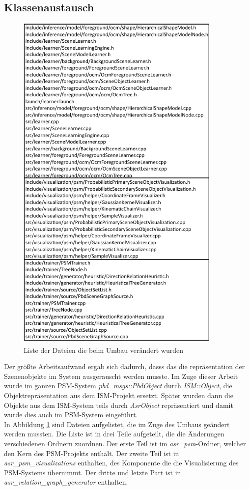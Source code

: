 \subsection{Klassenaustausch}
\begin{figure}
	\centering
	\includegraphics[width=10cm]{bilder/filelist.pdf}
	\caption{Liste der Dateien die beim Umbau verändert wurden}
	\label{img:filelist}
\end{figure}
Der größte Arbeitsaufwand ergab sich dadurch, dasss das die repräsentation der Szenenobjekte im System ausgerauscht werden musste. Im Zuge dieser Arbeit wurde im ganzen PSM-System \textit{pbd\_msgs::PbdObject} durch \textit{ISM::Object}, die Objektrepräsentation aus dem ISM-Projekt ersetzt. Später wurden dann die Objekte aus dem ISM-System teils durch \textit{AsrObject} repräsentiert und damit wurde dies auch im PSM-System eingeführt.\smallskip\\
In Abbildung \ref{img:filelist} sind Dateien aufgelistet, die im Zuge des Umbaus geändert werden mussten. Die Liste ist in drei Teile aufgeteilt, die die Änderungen verschiedenen Ordnern zuordnen. Der erste Teil ist im \textit{asr\_psm}-Ordner, welcher den Kern des PSM-Projekts enthält. Der zweite Teil ist in \textit{asr\_psm\_visualizations} enthalten, des Komponente die die Visualisierung des PSM-Systems übernimmt. Der dritte und letzte Part ist in \textit{asr\_relation\_graph\_generator} enthalten.


